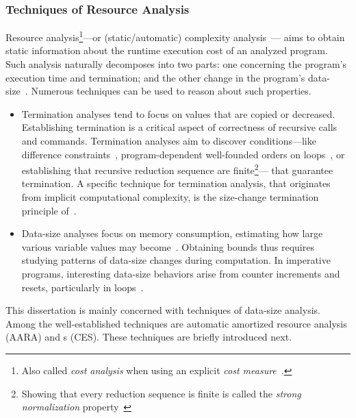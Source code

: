 \subsubsection{Techniques of Resource Analysis}\label{resource-analysis}

Resource analysis\footnote{
Also called \emph{cost analysis} when using an explicit \emph{cost measure}~\cite{albert2008}.
}---or (static/automatic) {complexity analysis}~\cite{rosendahl1989,leivant2013}---%
aims to obtain static information about the runtime {execution cost} of an analyzed program.
Such analysis naturally decomposes into two parts: one concerning the program's execution time and termination;
and the other change in the program's data-size~\cite{jones2009}.
Numerous techniques can be used to reason about such properties.

\begin{itemize}
\item Termination analyses tend to focus on values that are copied or decreased.
      Establishing termination is a critical aspect of correctness of recursive calls and commands.
      Termination analyses aim to discover conditions---like difference constraints~\cite{sinn2017},
      program-dependent well-founded orders on loops~\cite{lee2001}, or
      establishing that recursive reduction sequence are finite\footnote{
      Showing that every reduction sequence is finite is called the \emph{strong normalization} property~\cite[p. 36]{bertot2004}}---
      that guarantee termination.
      A specific technique for termination analysis, that originates from implicit computational complexity, is the size-change termination principle of~\textcite{lee2001}.
\item Data-size analyses focus on memory consumption, estimating how large various variable values may become~\cite{lommen2023}.
      Obtaining bounds thus requires studying patterns of data-size changes during computation.
      In imperative programs, interesting data-size behaviors arise from counter increments and resets, particularly in loops~\cite{sinn2017,benamram2020}.
\end{itemize}

This dissertation is mainly concerned with techniques of data-size analysis.
Among the well-established techniques are automatic
amortized resource analysis (AARA) and s (CES). These techniques are briefly introduced next.

